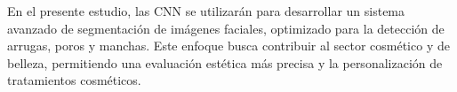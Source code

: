 En el presente estudio, las CNN se utilizarán para desarrollar un sistema avanzado de segmentación de imágenes faciales, optimizado para la detección de arrugas, poros y manchas. Este enfoque busca contribuir al sector cosmético y de belleza, permitiendo una evaluación estética más precisa y la personalización de tratamientos cosméticos.

